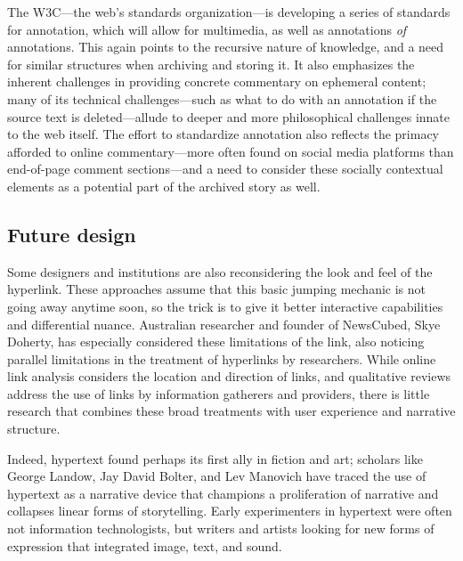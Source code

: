 The W3C---the web's standards organization---is developing a series of standards for annotation, which will allow for multimedia, as well as annotations \emph{of} annotations. This again points to the recursive nature of knowledge, and a need for similar structures when archiving and storing it. It also emphasizes the inherent challenges in providing concrete commentary on ephemeral content; many of its technical challenges---such as what to do with an annotation if the source text is deleted---allude to deeper and more philosophical challenges innate to the web itself. The effort to standardize annotation also reflects the primacy afforded to online commentary---more often found on social media platforms than end-of-page comment sections---and a need to consider these socially contextual elements as a potential part of the archived story as well.

\subsection{Future design}

Some designers and institutions are also reconsidering the look and feel of the hyperlink. These approaches assume that this basic jumping mechanic is not going away anytime soon, so the trick is to give it better interactive capabilities and differential nuance. Australian researcher and founder of NewsCubed, Skye Doherty, has especially considered these limitations of the link, also noticing parallel limitations in the treatment of hyperlinks by researchers. While online link analysis considers the location and direction of links, and qualitative reviews address the use of links by information gatherers and providers, there is little research that combines these broad treatments with user experience and narrative structure.

Indeed, hypertext found perhaps its first ally in fiction and art; scholars like George Landow, Jay David Bolter, and Lev Manovich have traced the use of hypertext as a narrative device that champions a proliferation of narrative and collapses linear forms of storytelling. Early experimenters in hypertext were often not information technologists, but writers and artists looking for new forms of expression that integrated image, text, and sound.

